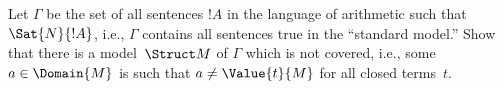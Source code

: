 

\begin{prob}
Let $\Gamma$ be the set of all sentences $!A$ in the language of
arithmetic such that $\Sat{N}{!A}$, i.e., $\Gamma$ contains all
sentences true in the ``standard model.'' Show that there is a
model~$\Struct M$ of $\Gamma$ which is not covered, i.e., some
$a \in \Domain{M}$ is such that $a \neq \Value{t}{M}$ for all
closed terms~$t$.
\end{prob}
